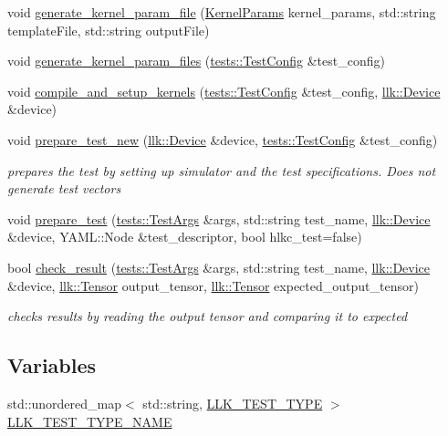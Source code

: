 \begin{DoxyCompactItemize}
\item 
void \hyperlink{namespacetests_a3bc44090589e89c20ce323407e0020ec}{generate\+\_\+kernel\+\_\+param\+\_\+file} (\hyperlink{structtests_1_1KernelParams}{Kernel\+Params} kernel\+\_\+params, std\+::string template\+File, std\+::string output\+File)
\item 
void \hyperlink{namespacetests_a50ddb7f644415e5a1c458bd33960fb95}{generate\+\_\+kernel\+\_\+param\+\_\+files} (\hyperlink{structtests_1_1TestConfig}{tests\+::\+Test\+Config} \&test\+\_\+config)
\item 
void \hyperlink{namespacetests_af43423e70aab84bb15efb97001a0c262}{compile\+\_\+and\+\_\+setup\+\_\+kernels} (\hyperlink{structtests_1_1TestConfig}{tests\+::\+Test\+Config} \&test\+\_\+config, \hyperlink{classllk_1_1Device}{llk\+::\+Device} \&device)
\item 
void \hyperlink{namespacetests_a569c10d43808a8b64a7a86927c89a9b0}{prepare\+\_\+test\+\_\+new} (\hyperlink{classllk_1_1Device}{llk\+::\+Device} \&device, \hyperlink{structtests_1_1TestConfig}{tests\+::\+Test\+Config} \&test\+\_\+config)
\begin{DoxyCompactList}\small\item\em prepares the test by setting up simulator and the test specifications. Does not generate test vectors \end{DoxyCompactList}\item 
void \hyperlink{namespacetests_a2b5f0d073bc48ee9649948c6426531a0}{prepare\+\_\+test} (\hyperlink{structtests_1_1TestArgs}{tests\+::\+Test\+Args} \&args, std\+::string test\+\_\+name, \hyperlink{classllk_1_1Device}{llk\+::\+Device} \&device, Y\+A\+M\+L\+::\+Node \&test\+\_\+descriptor, bool hlkc\+\_\+test=false)
\item 
bool \hyperlink{namespacetests_aa238e405385c3782bb56e0d2c5d5c6a2}{check\+\_\+result} (\hyperlink{structtests_1_1TestArgs}{tests\+::\+Test\+Args} \&args, std\+::string test\+\_\+name, \hyperlink{classllk_1_1Device}{llk\+::\+Device} \&device, \hyperlink{classllk_1_1Tensor}{llk\+::\+Tensor} output\+\_\+tensor, \hyperlink{classllk_1_1Tensor}{llk\+::\+Tensor} expected\+\_\+output\+\_\+tensor)
\begin{DoxyCompactList}\small\item\em checks results by reading the output tensor and comparing it to expected \end{DoxyCompactList}\end{DoxyCompactItemize}
\subsection*{Variables}
\begin{DoxyCompactItemize}
\item 
std\+::unordered\+\_\+map$<$ std\+::string, \hyperlink{namespacetests_a25585fda9706046718066368a7a86897}{L\+L\+K\+\_\+\+T\+E\+S\+T\+\_\+\+T\+Y\+PE} $>$ \hyperlink{namespacetests_a29444f10f17f711fe976c141033f5048}{L\+L\+K\+\_\+\+T\+E\+S\+T\+\_\+\+T\+Y\+P\+E\+\_\+\+N\+A\+ME}
\end{DoxyCompactItemize}


